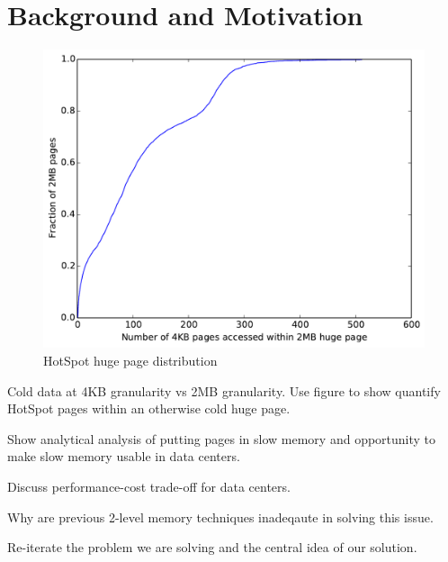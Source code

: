 \section{Background and Motivation}
\label{motivation}

\begin{figure}[t]
\centering
\includegraphics[width=1.0\columnwidth]{thermostat/figures/hotspot-cdf.png}
\caption{HotSpot huge page distribution}
\vspace{-0.175in}
\label{fig:hotspot-cdf}
\end{figure}

Cold data at 4KB granularity vs 2MB granularity. Use figure to show quantify
HotSpot pages within an otherwise cold huge page.

Show analytical analysis of putting pages in slow memory and opportunity to make
slow memory usable in data centers.

Discuss performance-cost trade-off for data centers.

Why are previous 2-level memory techniques inadeqaute in solving this issue.

Re-iterate the problem we are solving and the central idea of our solution.


